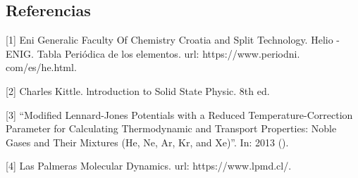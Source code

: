 \documentclass[10pt,letterpaper,twocolumn]{article}
\begin{document}
\subsection*{Referencias}

[1] Eni Generalic Faculty Of Chemistry Croatia and Split Technology. Helio
- ENIG. Tabla Periódica de los elementos. url: https://www.periodni.
com/es/he.html.

[2] Charles Kittle. lntroduction to Solid State Physic. 8th ed.

[3] “Modified Lennard-Jones Potentials with a Reduced Temperature-Correction
Parameter for Calculating Thermodynamic and Transport Properties: Noble 
Gases and Their Mixtures (He, Ne, Ar, Kr, and Xe)”. In: 2013 ().

[4] Las Palmeras Molecular Dynamics. url: https://www.lpmd.cl/.
\end{document}
